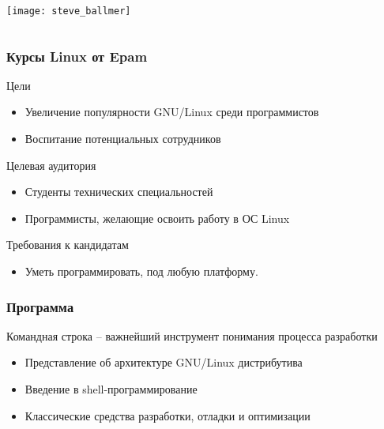 
\begin{frame}{}
	\begin{columns}
		\Huge
		\center\texttt{[image: steve\_ballmer]}
	\end{columns}
\end{frame}


\begin{frame}
	\frametitle{Курсы Linux от Epam}

	\begin{block}{Цели}
		\begin{itemize}
			\item Увеличение популярности GNU/Linux среди программистов
			\item Воспитание потенциальных сотрудников
		\end{itemize}
	\end{block}

	\pause

	\begin{block}{Целевая аудитория}
		\begin{itemize}
			\item Студенты технических специальностей
			\item Программисты, желающие освоить работу в ОС Linux
		\end{itemize}
	\end{block}

	\begin{block}{Требования к кандидатам}
		\begin{itemize}
			\item Уметь программировать, под любую платформу.
		\end{itemize}
	\end{block}
\end{frame}

\begin{frame}
	\frametitle{Программа}

	\begin{block}{Командная строка -- важнейший инструмент понимания процесса разработки}
		\begin{itemize}
			\item Представление об архитектуре GNU/Linux дистрибутива
			\item Введение в shell-программирование
			\item Классические средства разработки, отладки и оптимизации
		\end{itemize}
	\end{block}
\end{frame}

